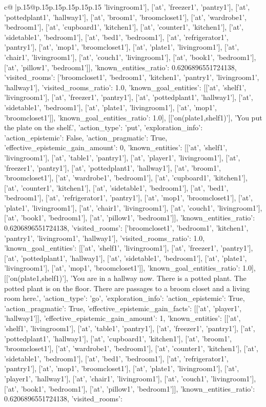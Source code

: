 \documentclass{article}
\begin{document}
{\begin{supertabular}{c@{$\;$}|p{.15\linewidth}@{}p{.15\linewidth}p{.15\linewidth}p{.15\linewidth}p{.15\linewidth}p{.15\linewidth}}
{{{'livingroom1'], ['at', 'freezer1', 'pantry1'], ['at', 'pottedplant1', 'hallway1'], ['at', 'broom1', 'broomcloset1'], ['at', 'wardrobe1', 'bedroom1'], ['at', 'cupboard1', 'kitchen1'], ['at', 'counter1', 'kitchen1'], ['at', 'sidetable1', 'bedroom1'], ['at', 'bed1', 'bedroom1'], ['at', 'refrigerator1', 'pantry1'], ['at', 'mop1', 'broomcloset1'], ['at', 'plate1', 'livingroom1'], ['at', 'chair1', 'livingroom1'], ['at', 'couch1', 'livingroom1'], ['at', 'book1', 'bedroom1'], ['at', 'pillow1', 'bedroom1']], 'known_entities_ratio': 0.6206896551724138, 'visited_rooms': ['broomcloset1', 'bedroom1', 'kitchen1', 'pantry1', 'livingroom1', 'hallway1'], 'visited_rooms_ratio': 1.0, 'known_goal_entities': [['at', 'shelf1', 'livingroom1'], ['at', 'freezer1', 'pantry1'], ['at', 'pottedplant1', 'hallway1'], ['at', 'sidetable1', 'bedroom1'], ['at', 'plate1', 'livingroom1'], ['at', 'mop1', 'broomcloset1']], 'known_goal_entities_ratio': 1.0}}], [['on(plate1,shelf1)'], 'You put the plate on the shelf.', {'action_type': 'put', 'exploration_info': {'action_epistemic': False, 'action_pragmatic': True, 'effective_epistemic_gain_amount': 0, 'known_entities': [['at', 'shelf1', 'livingroom1'], ['at', 'table1', 'pantry1'], ['at', 'player1', 'livingroom1'], ['at', 'freezer1', 'pantry1'], ['at', 'pottedplant1', 'hallway1'], ['at', 'broom1', 'broomcloset1'], ['at', 'wardrobe1', 'bedroom1'], ['at', 'cupboard1', 'kitchen1'], ['at', 'counter1', 'kitchen1'], ['at', 'sidetable1', 'bedroom1'], ['at', 'bed1', 'bedroom1'], ['at', 'refrigerator1', 'pantry1'], ['at', 'mop1', 'broomcloset1'], ['at', 'plate1', 'livingroom1'], ['at', 'chair1', 'livingroom1'], ['at', 'couch1', 'livingroom1'], ['at', 'book1', 'bedroom1'], ['at', 'pillow1', 'bedroom1']], 'known_entities_ratio': 0.6206896551724138, 'visited_rooms': ['broomcloset1', 'bedroom1', 'kitchen1', 'pantry1', 'livingroom1', 'hallway1'], 'visited_rooms_ratio': 1.0, 'known_goal_entities': [['at', 'shelf1', 'livingroom1'], ['at', 'freezer1', 'pantry1'], ['at', 'pottedplant1', 'hallway1'], ['at', 'sidetable1', 'bedroom1'], ['at', 'plate1', 'livingroom1'], ['at', 'mop1', 'broomcloset1']], 'known_goal_entities_ratio': 1.0}}], [['on(plate1,shelf1)'], 'You are in a hallway now. There is a potted plant. The potted plant is on the floor. There are passages to a broom closet and a living room here.', {'action_type': 'go', 'exploration_info': {'action_epistemic': True, 'action_pragmatic': True, 'effective_epistemic_gain_facts': [['at', 'player1', 'hallway1']], 'effective_epistemic_gain_amount': 1, 'known_entities': [['at', 'shelf1', 'livingroom1'], ['at', 'table1', 'pantry1'], ['at', 'freezer1', 'pantry1'], ['at', 'pottedplant1', 'hallway1'], ['at', 'cupboard1', 'kitchen1'], ['at', 'broom1', 'broomcloset1'], ['at', 'wardrobe1', 'bedroom1'], ['at', 'counter1', 'kitchen1'], ['at', 'sidetable1', 'bedroom1'], ['at', 'bed1', 'bedroom1'], ['at', 'refrigerator1', 'pantry1'], ['at', 'mop1', 'broomcloset1'], ['at', 'plate1', 'livingroom1'], ['at', 'player1', 'hallway1'], ['at', 'chair1', 'livingroom1'], ['at', 'couch1', 'livingroom1'], ['at', 'book1', 'bedroom1'], ['at', 'pillow1', 'bedroom1']], 'known_entities_ratio': 0.6206896551724138, 'visited_rooms': }}}
\end{supertabular}}
\end{document}
